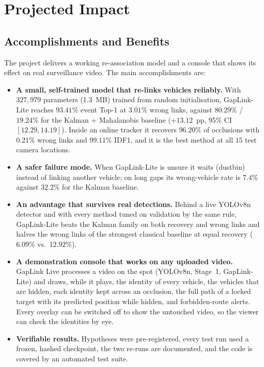 \chapter{Projected Impact}
\label{chap:projected_impact}

\section{Accomplishments and Benefits}
\label{sec:accomplishments}

The project delivers a working re-association model and a console that shows its effect on real surveillance video. The main accomplishments are:
\begin{itemize}
    \item \textbf{A small, self-trained model that re-links vehicles reliably.} With $327{,}979$ parameters (1.3~MB) trained from random initialisation, GapLink-Lite reaches $93.41\%$ event Top-1 at $3.01\%$ wrong links, against $80.29\%$ / $19.24\%$ for the Kalman + Mahalanobis baseline ($+13.12$~pp, 95\% CI $[12.29, 14.19]$). Inside an online tracker it recovers $96.20\%$ of occlusions with $0.21\%$ wrong links and $99.11\%$ IDF1, and it is the best method at all $15$ test camera locations.
    \item \textbf{A safer failure mode.} When GapLink-Lite is unsure it waits (dustbin) instead of linking another vehicle; on long gaps its wrong-vehicle rate is $7.4\%$ against $32.2\%$ for the Kalman baseline.
    \item \textbf{An advantage that survives real detections.} Behind a live YOLOv8n detector and with every method tuned on validation by the same rule, GapLink-Lite beats the Kalman family on both recovery and wrong links and halves the wrong links of the strongest classical baseline at equal recovery ($6.09\%$ vs.\ $12.92\%$).
    \item \textbf{A demonstration console that works on any uploaded video.} GapLink Live processes a video on the spot (YOLOv8n, Stage~1, GapLink-Lite) and draws, while it plays, the identity of every vehicle, the vehicles that are hidden, each identity kept across an occlusion, the full path of a locked target with its predicted position while hidden, and forbidden-route alerts. Every overlay can be switched off to show the untouched video, so the viewer can check the identities by eye.
    \item \textbf{Verifiable results.} Hypotheses were pre-registered, every test run used a frozen, hashed checkpoint, the two re-runs are documented, and the code is covered by an automated test suite.
\end{itemize}

